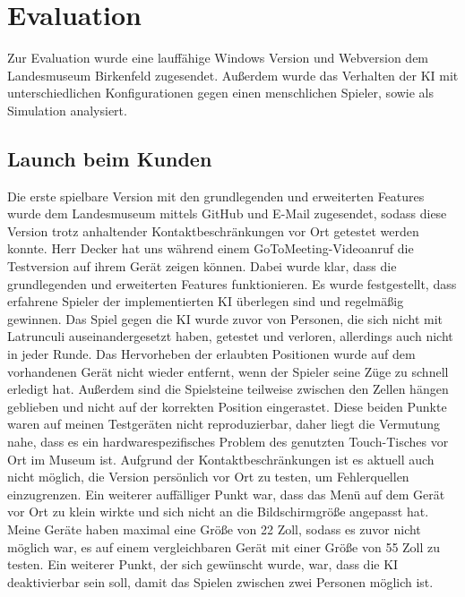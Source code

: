 
\chapter{Evaluation}
\label{ch:Evaluierung}
Zur Evaluation wurde eine lauffähige Windows Version und Webversion dem Landesmuseum Birkenfeld zugesendet. Außerdem wurde das Verhalten der KI mit unterschiedlichen Konfigurationen gegen einen menschlichen Spieler, sowie als Simulation analysiert.

\section{Launch beim Kunden}
\label{ch:Evaluierung:sec:Launch}
Die erste spielbare Version mit den grundlegenden und erweiterten Features wurde dem Landesmuseum mittels GitHub und E-Mail zugesendet, sodass diese Version trotz anhaltender Kontaktbeschränkungen vor Ort getestet werden konnte. Herr Decker hat uns während einem GoToMeeting-Videoanruf die Testversion auf ihrem Gerät zeigen können. Dabei wurde klar, dass die grundlegenden und erweiterten Features funktionieren. Es wurde festgestellt, dass erfahrene Spieler der implementierten KI überlegen sind und regelmäßig gewinnen. Das Spiel gegen die KI wurde zuvor von Personen, die sich nicht mit Latrunculi auseinandergesetzt haben, getestet und verloren, allerdings auch nicht in jeder Runde. Das Hervorheben der erlaubten Positionen wurde auf dem vorhandenen Gerät nicht wieder entfernt, wenn der Spieler seine Züge zu schnell erledigt hat. Außerdem sind die Spielsteine teilweise zwischen den Zellen hängen geblieben und nicht auf der korrekten Position eingerastet. Diese beiden Punkte waren auf meinen Testgeräten nicht reproduzierbar, daher liegt die Vermutung nahe, dass es ein hardwarespezifisches Problem des genutzten Touch-Tisches vor Ort im Museum ist. Aufgrund der Kontaktbeschränkungen ist es aktuell auch nicht möglich, die Version persönlich vor Ort zu testen, um Fehlerquellen einzugrenzen. Ein weiterer auffälliger Punkt war, dass das Menü auf dem Gerät vor Ort zu klein wirkte und sich nicht an die Bildschirmgröße angepasst hat. Meine Geräte haben maximal eine Größe von 22 Zoll, sodass es zuvor nicht möglich war, es auf einem vergleichbaren Gerät mit einer Größe von 55 Zoll zu testen.
Ein weiterer Punkt, der sich gewünscht wurde, war, dass die KI deaktivierbar sein soll, damit das Spielen zwischen zwei Personen möglich ist.

